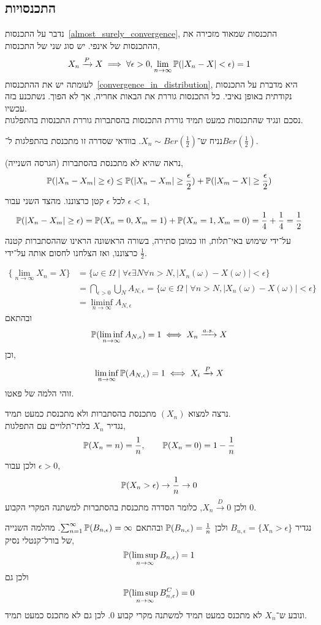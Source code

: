 \subsection{התכנסויות}
נדבר על התכנסות\ \ref{almost_surely_convergence}, התכנסות שמאוד מזכירה את ההתכנסות של אינפי.
יש סוג שני של התכנסות,
\[
	X_n \xrightarrow{P} X \implies \forall \epsilon > 0, \lim_{n \to \infty} \mathbb{P}(|X_n - X| < \epsilon) = 1
\]
לעומתה יש את ההתכנסות\ \ref{convergence_in_distribution}, היא מדברת על התכנסות נקודתית באופן נאיבי.
כל התכנסות גוררת את הבאות אחריה, אך לא הפוך. נשתכנע בזה עכשיו. \\
נסכם ונגיד שהתכנסות כמעט תמיד גוררת התכנסות בהסתברות גוררת התכנסות בהתפלגות.
\begin{example}
	נניח ש־$X_n \sim Ber(\frac{1}{2})$.
	בוודאי שסדרה זו מתכנסת בהתפלגות ל־$Ber(\frac{1}{2})$.

	נראה שהיא לא מתכנסת בהסתברות (הגרסה השנייה),
	\[
		\mathbb{P}(|X_n - X_m| \ge \epsilon)
		\le \mathbb{P}(|X_n - X_m| \ge \frac{\epsilon}{2}) + \mathbb{P}(|X_m - X| \ge \frac{\epsilon}{2})
	\]
	לכל $\epsilon$ קטן כרצוננו.
	מהצד השני עבור $\epsilon < 1$,
	\[
		\mathbb{P}(|X_n - X_m| \ge \epsilon)
		= \mathbb{P}(X_n = 0, X_m = 1) + \mathbb{P}(X_n = 1, X_m = 0)
		= \frac{1}{4} + \frac{1}{4} = \frac{1}{2}
	\]
	על־ידי שימוש באי־תלות, וזו כמובן סתירה, בשורה הראשונה הראינו שההסתברות קטנה כרצוננו, ואז הצלחנו לחסום אותה על־ידי $\frac{1}{2}$.
\end{example}
\begin{example}
	\begin{align*}
		\{ \lim_{n \to \infty} X_n = X \}
		& = \{ \omega \in \Omega \mid \forall \epsilon \exists N \forall n > N, |X_n(\omega) - X(\omega)| < \epsilon \} \\
		& = \bigcap_{\epsilon > 0} \bigcup_{N} A_{N, \epsilon} = \{ \omega \in \Omega \mid \forall n > N, |X_n(\omega) - X(\omega)| < \epsilon \} \\
		& = \liminf_{n \to \infty} A_{N, \epsilon}
	\end{align*}
	ובהתאם
	\[
		\mathbb{P}(\liminf_{n \to \infty} A_{N, \epsilon}) = 1 \iff X_n \xrightarrow{a.s.} X
	\]
	וכן,
	\[
		\liminf_{n \to \infty} \mathbb{P}(A_{N, \epsilon}) = 1 \iff X_i \xrightarrow{P} X
	\]
	זוהי הלמה של פאטו.
\end{example}
\begin{example}
	נרצה למצוא $(X_n)$ מתכנסת בהסתברות ולא מתכנסת כמעט תמיד. \\
	נגדיר $X_n$ בלתי־תלויים עם התפלגות,
	\[
		\mathbb{P}(X_n = n) = \frac{1}{n},
		\qquad
		\mathbb{P}(X_n = 0) = 1 - \frac{1}{n}
	\]
	ולכן עבור $\epsilon > 0$,
	\[
		\mathbb{P}(X_n > \epsilon) \to \frac{1}{n} \to 0
	\]
	ולכן $X_n \xrightarrow{D} 0$, כלומר הסדרה מתכנסת בהסתברות למשתנה המקרי הקבוע $0$.

	נגדיר $B_{n, \epsilon} = \{ X_n > \epsilon \}$ ולכן $\mathbb{P}(B_{n, \epsilon}) = \frac{1}{n}$ ובהתאם $\sum_{n = 1}^{\infty} \mathbb{P}(B_{n, \epsilon}) = \infty$.
	מהלמה השנייה של בורל־קנטלי נסיק,
	\[
		\mathbb{P}(\limsup_{n \to \infty} B_{n, \epsilon}) = 1
	\]
	ולכן גם
	\[
		\mathbb{P}(\limsup_{n \to \infty} B_{n, \epsilon}^C) = 0
	\]
	ונובע ש־$X_n$ לא מתכנס כמעט תמיד למשתנה מקרי קבוע $0$.
	לכן גם לא מתכנס כמעט תמיד.
\end{example}

\listoftheorems[title=הגדרות ומשפטים,ignoreall,show={theorem,definition},swapnumber,onlynamed={proposition}]

